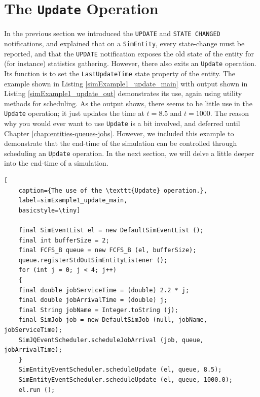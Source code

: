 \section{The \texttt{Update} Operation}
\label{sec:guided:update}

In the previous section we introduced the
\lstinline|UPDATE| and \lstinline|STATE CHANGED|
notifications,
and explained that on a \lstinline|SimEntity|,
every state-change must be reported,
and that the \lstinline|UPDATE| notification
exposes the old state of the entity
for (for instance) statistics gathering.
However, there also exits an \lstinline|Update|
operation.
Its function is to set the \lstinline|LastUpdateTime|
state property of the entity.
The example shown in
Listing \ref{simExample1_update_main}
with output
shown in Listing \ref{simExample1_update_out}
demonstrates its use,
again using utility methods
for scheduling.
As the output shows,
there seems to be little use in the \lstinline|Update|
operation; it just updates the time at $t=8.5$ and $t=1000$.
The reason why you would ever want to use \lstinline|Update|
is a bit involved,
and deferred until Chapter \ref{chap:entities-queues-jobs}.
However, we included this example to demonstrate
that the end-time of the simulation can be
controlled through scheduling an \lstinline|Update|
operation.
In the next section, we will delve a little deeper
into the end-time of a simulation.

\begin{lstfloat}
	\begin{lstlisting}[
	caption={The use of the \texttt{Update} operation.},
	label=simExample1_update_main,
	basicstyle=\tiny]
	
	final SimEventList el = new DefaultSimEventList ();
	final int bufferSize = 2;
	final FCFS_B queue = new FCFS_B (el, bufferSize);
	queue.registerStdOutSimEntityListener ();
	for (int j = 0; j < 4; j++)
	{
	final double jobServiceTime = (double) 2.2 * j;
	final double jobArrivalTime = (double) j;
	final String jobName = Integer.toString (j);
	final SimJob job = new DefaultSimJob (null, jobName, jobServiceTime);
	SimJQEventScheduler.scheduleJobArrival (job, queue, jobArrivalTime);
	}
	SimEntityEventScheduler.scheduleUpdate (el, queue, 8.5);
	SimEntityEventScheduler.scheduleUpdate (el, queue, 1000.0);
	el.run ();
	
	\end{lstlisting}
\end{lstfloat}

